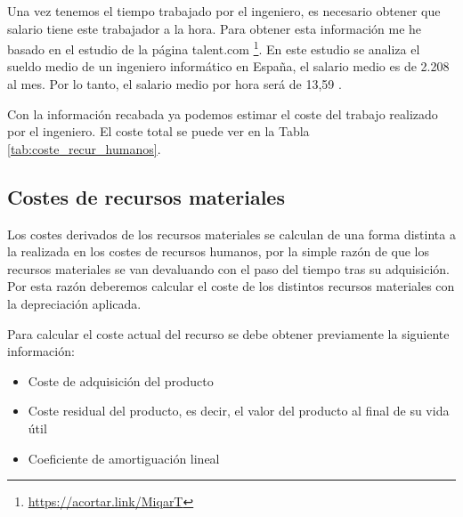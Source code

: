 Una vez tenemos el tiempo trabajado por el ingeniero, es necesario obtener que salario tiene este trabajador a la hora. Para obtener esta información me he basado en el estudio de la página talent.com \footnote{\url{https://acortar.link/MiqarT}}. En este estudio se analiza el sueldo medio de un ingeniero informático en España, el salario medio es de 2.208 \EURtm al mes. Por lo tanto, el salario medio por hora será de 13,59 \EURtm.

Con la información recabada ya podemos estimar el coste del trabajo realizado por el ingeniero. El coste total se puede ver en la Tabla \ref{tab:coste_recur_humanos}.

\begin{table}[h]
\centering
{}
\caption{Costes asociados a los recursos humanos}
\label{tab:coste_recur_humanos}
\end{table}

\subsection{Costes de recursos materiales}

Los costes derivados de los recursos materiales se calculan de una forma distinta a la realizada en los costes de recursos humanos, por la simple razón de que los recursos materiales se van devaluando con el paso del tiempo tras su adquisición. Por esta razón deberemos calcular el coste de los distintos recursos materiales con la depreciación aplicada.

Para calcular el coste actual del recurso se debe obtener previamente la siguiente información:

\begin{itemize}
\item Coste de adquisición del producto
\item Coste residual del producto, es decir, el valor del producto al final de su vida útil
\item Coeficiente de amortiguación lineal
\end{itemize}

